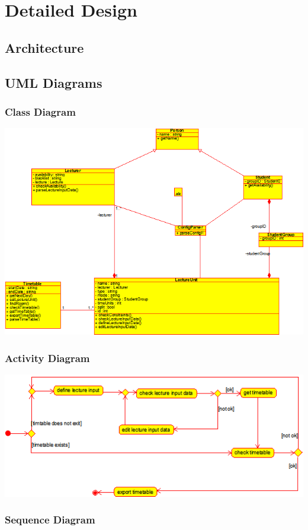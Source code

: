 \documentclass{scrreprt}
\begin{document}
	\chapter{Detailed Design}
	\section{Architecture}
	\section{UML Diagrams}
	\subsection{Class Diagram}
	\includegraphics{class diagram}
	\subsection{Activity Diagram}
	\includegraphics{activity diagram}
	\subsection{Sequence Diagram}
	
	
\end{document}
